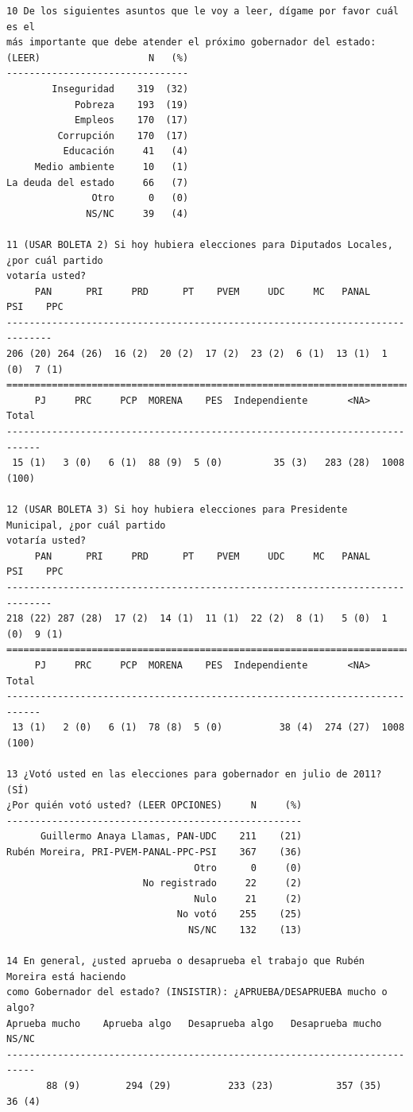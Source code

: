 \documentclass[letter,12pt]{article}
\begin{document}
\begin{scriptsize}
\begin{verbatim}
10 De los siguientes asuntos que le voy a leer, dígame por favor cuál es el 
más importante que debe atender el próximo gobernador del estado: 
(LEER)                   N   (%)
--------------------------------
        Inseguridad    319  (32)
            Pobreza    193  (19)
            Empleos    170  (17)
         Corrupción    170  (17)
          Educación     41   (4)
     Medio ambiente     10   (1)
La deuda del estado     66   (7)
               Otro      0   (0)
              NS/NC     39   (4)
 
11 (USAR BOLETA 2) Si hoy hubiera elecciones para Diputados Locales, ¿por cuál partido 
votaría usted?
     PAN      PRI     PRD      PT    PVEM     UDC     MC   PANAL    PSI    PPC 
------------------------------------------------------------------------------
206 (20) 264 (26)  16 (2)  20 (2)  17 (2)  23 (2)  6 (1)  13 (1)  1 (0)  7 (1) 
==============================================================================
     PJ     PRC     PCP  MORENA    PES  Independiente       <NA>       Total
----------------------------------------------------------------------------
 15 (1)   3 (0)   6 (1)  88 (9)  5 (0)         35 (3)   283 (28)  1008 (100)

12 (USAR BOLETA 3) Si hoy hubiera elecciones para Presidente Municipal, ¿por cuál partido 
votaría usted?
     PAN      PRI     PRD      PT    PVEM     UDC     MC   PANAL    PSI    PPC 
------------------------------------------------------------------------------
218 (22) 287 (28)  17 (2)  14 (1)  11 (1)  22 (2)  8 (1)   5 (0)  1 (0)  9 (1) 
==============================================================================
     PJ     PRC     PCP  MORENA    PES  Independiente       <NA>       Total
----------------------------------------------------------------------------
 13 (1)   2 (0)   6 (1)  78 (8)  5 (0)          38 (4)  274 (27)  1008 (100)

13 ¿Votó usted en las elecciones para gobernador en julio de 2011? (SÍ) 
¿Por quién votó usted? (LEER OPCIONES)     N     (%)
----------------------------------------------------
      Guillermo Anaya Llamas, PAN-UDC    211    (21) 
Rubén Moreira, PRI-PVEM-PANAL-PPC-PSI    367    (36) 
                                 Otro      0     (0) 
                        No registrado     22     (2) 
                                 Nulo     21     (2) 
                              No votó    255    (25) 
                                NS/NC    132    (13) 

14 En general, ¿usted aprueba o desaprueba el trabajo que Rubén Moreira está haciendo 
como Gobernador del estado? (INSISTIR): ¿APRUEBA/DESAPRUEBA mucho o algo?
Aprueba mucho    Aprueba algo   Desaprueba algo   Desaprueba mucho    NS/NC 
---------------------------------------------------------------------------
       88 (9)        294 (29)          233 (23)           357 (35)   36 (4) 


\end{verbatim}
\end{scriptsize}
\end{document}

